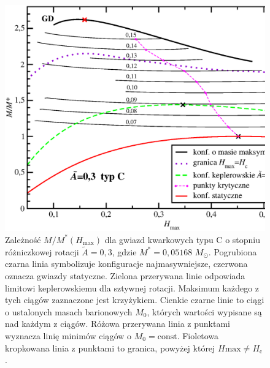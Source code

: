 \documentclass{bachelor_thesis}
\begin{document}
            \begin{figure}[h!]
            \centering
            \includegraphics[scale=.49]{figures/RysMofHstrA03.eps}
            \caption{Zależność $M/M^*(H_\textrm{max})$ dla gwiazd kwarkowych typu C o stopniu różniczkowej rotacji $\tilde{A}=0,3$, gdzie $M^*=0,05168$ $M_\odot$. Pogrubiona czarna linia symbolizuje konfiguracje najmasywniejsze, czerwona oznacza gwiazdy statyczne. Zielona przerywana linie odpowiada limitowi keplerowskiemu dla sztywnej rotacji. Maksimum każdego z tych ciągów zaznaczone jest krzyżykiem. Cienkie czarne linie to ciągi o ustalonych masach barionowych $M_0$, których wartości wypisane są nad każdym z ciągów. Różowa przerywana linia z punktami wyznacza linię minimów ciągów o $M_0=\textrm{const}$. Fioletowa kropkowana linia z punktami to granica, powyżej której $H\textrm{max}\neq H_\textrm{c}$.}
            \label{RysMofHstrA03}
            \end{figure}
\end{document}
